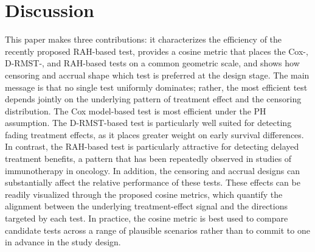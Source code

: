 \documentclass[12pt]{article}
\begin{document}
\begin{table}[ht]
\centering
\caption{Sensitivity to analysis horizon, dropout rate, and hazard structure; the common baseline is $\tau=24$, $\lambda_c=0.005$, fitted non-PH, $n=300$ per arm and $B=500$.}
\label{tab:sens-are}
\end{table}


\section{Discussion}
\label{sec:discussion}


This paper makes three contributions: it characterizes the efficiency of the recently proposed RAH-based test, provides a cosine metric that places the Cox-, D-RMST-, and RAH-based tests on a common geometric scale, and shows how censoring and accrual shape which test is preferred at the design stage. The main message is that no single test uniformly dominates; rather, the most efficient test depends jointly on the underlying pattern of treatment effect and the censoring distribution. The Cox model-based test is most efficient under the PH assumption. The D-RMST-based test is particularly well suited for detecting fading treatment effects, as it places greater weight on early survival differences. In contrast, the RAH-based test is particularly attractive for detecting delayed treatment benefits, a pattern that has been repeatedly observed in studies of immunotherapy in oncology. In addition, the censoring and accrual designs can substantially affect the relative performance of these tests. These effects can be readily visualized through the proposed cosine metrics, which quantify the alignment between the underlying treatment-effect signal and the directions targeted by each test. In practice, the cosine metric is best used to compare candidate tests across a range of plausible scenarios rather than to commit to one in advance in the study design.
\end{document}
